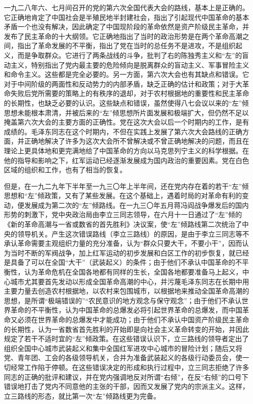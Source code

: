 一九二八年六、七月间召开的党的第六次全国代表大会的路线，基本上是正确的。它正确地肯定了中国社会是半殖民地半封建社会，指出了引起现代中国革命的基本矛盾一个也没有解决，因此确定了中国现阶段的革命依然是资产阶级民主革命，并发布了民主革命的十大纲领。它正确地指出了当时的政治形势是在两个革命高潮之间，指出了革命发展的不平衡，指出了党在当时的总任务不是进攻，不是组织起义，而是争取群众。它进行了两条战线的斗争，批判了右的陈独秀主义和“左”的盲动主义，特别指出了党内最主要的危险倾向是脱离群众的盲动主义、军事冒险主义和命令主义。这些都是完全必要的。另一方面，第六次大会也有其缺点和错误。它对于中间阶级的两面性和反动势力的内部矛盾，缺乏正确的估计和政策；对于大革命失败后党所需要的策略上的有秩序的退却，对于农村根据地的重要性和民主革命的长期性，也缺乏必要的认识。这些缺点和错误，虽然使得八七会议以来的“左”倾思想未能根本肃清，并被后来的“左”倾思想所片面发展和极端扩大，但仍然不足以掩盖第六次大会的主要方面的正确性。党在这次大会以后一个时期内的工作，是有成绩的。毛泽东同志在这个时期内，不但在实践上发展了第六次大会路线的正确方面，并正确地解决了许多为这次大会所不曾解决或不曾正确地解决的问题，而且在理论上更具体地和更完满地给了中国革命的方向以马克思列宁主义的科学根据。在他的指导和影响之下，红军运动已经逐渐发展成为国内政治的重要因素。党在白色区域的组织和工作，也有了相当的恢复。

但是，在一九二九年下半年至一九三〇年上半年间，还在党内存在着的若干“左”倾思想和“左”倾政策，又有了某些发展。在这个基础上，遇着时局的对革命有利的变动，便发展成为第二次的“左”倾路线。在一九三〇年五月蒋冯阎战争爆发后的国内形势的刺激下，党中央政治局由李立三同志领导，在六月十一日通过了“左”倾的《新的革命高潮与一省或数省的首先胜利》决议案，使“左”倾路线第二次统治了中央的领导机关。产生这次错误路线（李立三路线）的原因，是由于李立三同志等不承认革命需要主观组织力量的充分准备，认为“群众只要大干，不要小干”，因而认为当时不断的军阀战争，加上红军运动的初步发展和白区工作的初步恢复，就已经是具备了可以在全国“大干”（武装起义）的条件；由于他们不承认中国革命的不平衡性，认为革命危机在全国各地都有同样的生长，全国各地都要准备马上起义，中心城市尤其要首先发动以形成全国革命高潮的中心，并污蔑毛泽东同志在长期中用主要力量去创造农村根据地，以农村来包围城市，以根据地来推动全国革命高潮的思想，是所谓“极端错误的”“农民意识的地方观念与保守观念”；由于他们不承认世界革命的不平衡性，认为中国革命的总爆发必将引起世界革命的总爆发，而中国革命又必须在世界革命的总爆发中才能成功；由于他们不承认中国资产阶级民主革命的长期性，认为一省数省首先胜利的开始即是向社会主义革命转变的开始，并因此规定了若干不适时宜的“左”倾政策。在这些错误认识下，立三路线的领导者定出了组织全国中心城市武装起义和集中全国红军进攻中心城市的冒险计划；随后又将党、青年团、工会的各级领导机关，合并为准备武装起义的各级行动委员会，使一切经常工作陷于停顿。在这些错误决定的形成和执行过程中，立三同志拒绝了许多同志的正确的批评和建议，并在党内强调地反对所谓“右倾”，在反“右倾”的口号下错误地打击了党内不同意他的主张的干部，因而又发展了党内的宗派主义。这样，立三路线的形态，就比第一次“左”倾路线更为完备。

